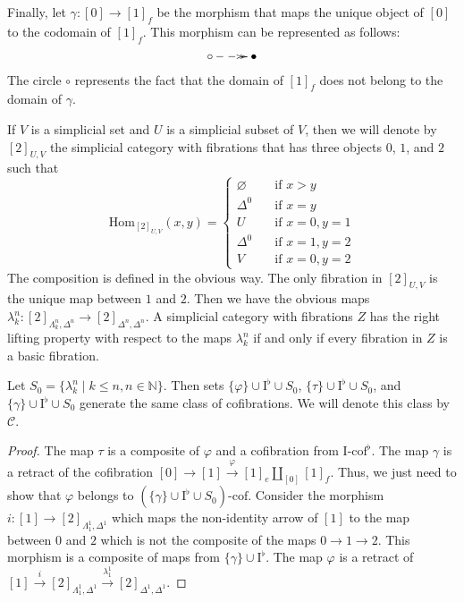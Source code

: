 \documentclass[reqno]{amsart}
\theoremstyle{definition}
\theoremstyle{remark}
\newcommand{\fs}[1]{\mathrm{#1}}
\newcommand{\Hom}{\fs{Hom}}
\newcommand{\I}{\fs{I}}
\newcommand{\class}[2]{#1\text{-}\mathrm{#2}}
\newcommand{\Icof}[1][\I]{\class{#1}{cof}}
\numberwithin{figure}{section}
\begin{document}
Finally, let $\gamma : [0] \to [1]_f$ be the morphism that maps the unique object of $[0]$ to the codomain of $[1]_f$.
This morphism can be represented as follows:
\[ \xymatrix{ \circ \ar@{-->>}[r] & \bullet } \]
The circle $\circ$ represents the fact that the domain of $[1]_f$ does not belong to the domain of $\gamma$.

If $V$ is a simplicial set and $U$ is a simplicial subset of $V$, then we will denote by $[2]_{U,V}$ the simplicial category with fibrations that has three objects $0$, $1$, and $2$ such that
\[ \Hom_{[2]_{U,V}}(x,y) =
  \begin{cases}
    \varnothing & \quad \text{if } x > y \\
    \Delta^0    & \quad \text{if } x = y \\
    U           & \quad \text{if } x = 0, y = 1 \\
    \Delta^0    & \quad \text{if } x = 1, y = 2 \\
    V           & \quad \text{if } x = 0, y = 2
  \end{cases}
\]
The composition is defined in the obvious way.
The only fibration in $[2]_{U,V}$ is the unique map between $1$ and $2$.
Then we have the obvious maps $\lambda^n_k : [2]_{\Lambda^n_k,\Delta^n} \to [2]_{\Delta^n,\Delta^n}$.
A simplicial category with fibrations $Z$ has the right lifting property with respect to the maps $\lambda^n_k$ if and only if every fibration in $Z$ is a basic fibration.

\begin{lem}
Let $S_0 = \{ \lambda^n_k \mid k \leq n, n \in \mathbb{N} \}$.
Then sets $\{ \varphi \} \cup \I^\flat \cup S_0$, $\{ \tau \} \cup \I^\flat \cup S_0$, and $\{ \gamma \} \cup \I^\flat \cup S_0$ generate the same class of cofibrations.
We will denote this class by $\mathcal{C}$.
\end{lem}
\begin{proof}
The map $\tau$ is a composite of $\varphi$ and a cofibration from $\Icof^\flat$.
The map $\gamma$ is a retract of the cofibration $[0] \to [1] \xrightarrow{\varphi} [1]_e \amalg_{[0]} [1]_f$.
Thus, we just need to show that $\varphi$ belongs to $\Icof[(\{ \gamma \} \cup \I^\flat \cup S_0)]$.
Consider the morphism $i : [1] \to [2]_{\Lambda^1_1,\Delta^1}$ which maps the non-identity arrow of $[1]$ to the map between $0$ and $2$ which is not the composite of the maps $0 \to 1 \to 2$.
This morphism is a composite of maps from $\{ \gamma \} \cup \I^\flat$.
The map $\varphi$ is a retract of $[1] \xrightarrow{i} [2]_{\Lambda^1_1,\Delta^1} \xrightarrow{\lambda^1_1} [2]_{\Delta^1,\Delta^1}$.
\end{proof}
\end{document}
